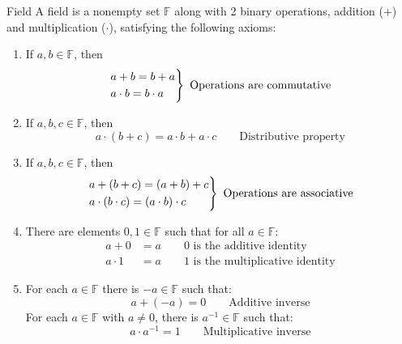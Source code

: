 \documentclass[12pt]{article}
\begin{document}
\begin{definition}{Field}{}
    A field is a nonempty set $ \mathbb{F} $ along with 2 binary operations, addition ($ + $) and multiplication ($ \cdot $), satisfying the following axioms:
    \begin{enumerate}
        \item If $ a, b \in \mathbb{F} $, then
        \begin{equation*}
            \begin{rcases*}
                a + b = b + a \\
                a \cdot b = b \cdot a
            \end{rcases*}
            \text{ Operations are commutative}
        \end{equation*}
        \item If $ a, b, c \in \mathbb{F} $, then
        \[ a \cdot \left( b + c \right) = a \cdot b + a \cdot c \qquad \text{Distributive property} \]
        \item If $ a, b, c \in \mathbb{F} $, then
        \begin{equation*}
            \begin{rcases*}
                a + \left( b + c \right) = \left( a + b \right) + c \\
                a \cdot \left( b \cdot c \right) = \left( a \cdot b \right) \cdot c
            \end{rcases*}
            \text{ Operations are associative}
        \end{equation*}
        \item There are elements $ 0, 1 \in \mathbb{F} $ such that for all $ a \in \mathbb{F} $:
        \begin{align*}
            a + 0 & = a \qquad \text{0 is the additive identity} \\
            a \cdot 1 &= a \qquad \text{1 is the multiplicative identity}
        \end{align*}
        \item For each $ a \in \mathbb{F} $ there is $ -a \in \mathbb{F} $ such that:
        \[ a + \left( -a \right) = 0 \qquad \text{Additive inverse} \]
        For each $ a \in \mathbb{F} $ with $ a \neq 0 $, there is $ a^{-1} \in \mathbb{F} $ such that:
        \[ a \cdot a^{-1} = 1 \qquad \text{Multiplicative inverse} \]
    \end{enumerate}
\end{definition}
\end{document}
